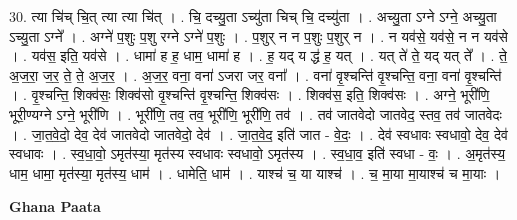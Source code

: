 \documentclass[17pt]{extarticle}
\begin{document}
30. त्या चि॑च् चि॒त् त्या त्या चि॑त् । . चि॒ दच्यु॒ता ऽच्यु॑ता चिच् चि॒ दच्यु॑ता । . अच्यु॒ता ऽग्ने ऽग्ने॒ अच्यु॒ता ऽच्यु॒ता ऽग्ने᳚ । . अग्ने॑ प॒शुः प॒शु रग्ने ऽग्ने॑ प॒शुः । . प॒शुर् न न प॒शुः प॒शुर् न । . न यव॑से॒ यव॑से॒ न न यव॑से । . यव॑स॒ इति॒ यव॑से । . धामा॑ ह ह॒ धाम॒ धामा॑ ह । . ह॒ यद् य द्ध॑ ह॒ यत् । . यत् ते॑ ते॒ यद् यत् ते᳚ । . ते॒ अ॒ज॒रा॒ ज॒र॒ ते॒ ते॒ अ॒ज॒र॒ । . अ॒ज॒र॒ वना॒ वना॑ ऽजरा जर॒ वना᳚ । . वना॑ वृ॒श्चन्ति॑ वृ॒श्चन्ति॒ वना॒ वना॑ वृ॒श्चन्ति॑ । . वृ॒श्चन्ति॒ शिक्व॑सः॒ शिक्व॑सो वृ॒श्चन्ति॑ वृ॒श्चन्ति॒ शिक्व॑सः । . शिक्व॑स॒ इति॒ शिक्व॑सः । . अग्ने॒ भूरी॑णि॒ भूरी॒ण्यग्ने ऽग्ने॒ भूरी॑णि । . भूरी॑णि॒ तव॒ तव॒ भूरी॑णि॒ भूरी॑णि॒ तव॑ । . तव॑ जातवेदो जातवेद॒ स्तव॒ तव॑ जातवेदः । . जा॒त॒वे॒दो॒ देव॒ देव॑ जातवेदो जातवेदो॒ देव॑ । . जा॒त॒वे॒द॒ इति॑ जात - वे॒दः॒ । . देव॑ स्वधावः स्वधावो॒ देव॒ देव॑ स्वधावः । . स्व॒धा॒वो॒ ऽमृत॑स्या॒ मृत॑स्य स्वधावः स्वधावो॒ ऽमृत॑स्य । . स्व॒धा॒व॒ इति॑ स्वधा - वः॒ । . अ॒मृत॑स्य॒ धाम॒ धामा॒ मृत॑स्या॒ मृत॑स्य॒ धाम॑ । . धामेति॒ धाम॑ । . याश्च॑ च॒ या याश्च॑ । . च॒ मा॒या मा॒याश्च॑ च मा॒याः । \newline

\textbf{Ghana Paata } \newline
\end{document}
